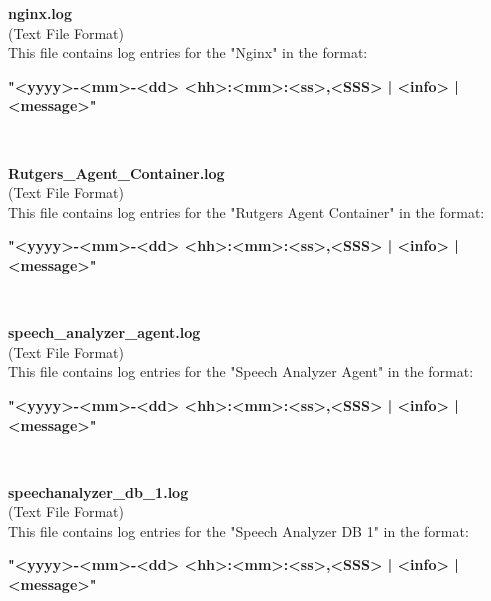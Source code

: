 \begin{description}
\begin{addmargin}[0em]{0em}
    \label{nginx.log}
    \begin{addmargin}[1em]{0em} %
        \textbf{nginx.log}\\
        (Text File Format)\\
        This file contains log entries for the "Nginx" in the format:
        \begin{addmargin}[1em]{0em}
            \textbf{"<yyyy>-<mm>-<dd> <hh>:<mm>:<ss>,<SSS> | <info> | <message>"}
        \end{addmargin}
    \end{addmargin} %
    \textbf{\\}

    \label{Rutgers_Agent_Container.log}
    \begin{addmargin}[1em]{0em} %
        \textbf{Rutgers\_Agent\_Container.log}\\
        (Text File Format)\\
        This file contains log entries for the "Rutgers Agent Container" in the format:
        \begin{addmargin}[1em]{0em}
            \textbf{"<yyyy>-<mm>-<dd> <hh>:<mm>:<ss>,<SSS> | <info> | <message>"}
        \end{addmargin}
    \end{addmargin} %
    \textbf{\\}

    \label{speech_analyzer_agent.log}
    \begin{addmargin}[1em]{0em} %
        \textbf{speech\_analyzer\_agent.log}\\
        (Text File Format)\\
        This file contains log entries for the "Speech Analyzer Agent" in the format:
        \begin{addmargin}[1em]{0em}
            \textbf{"<yyyy>-<mm>-<dd> <hh>:<mm>:<ss>,<SSS> | <info> | <message>"}
        \end{addmargin}
    \end{addmargin} %
    \textbf{\\}

    \label{speechanalyzer_db_1.log}
    \begin{addmargin}[1em]{0em} %
        \textbf{speechanalyzer\_db\_1.log}\\
        (Text File Format)\\
        This file contains log entries for the "Speech Analyzer DB 1" in the format:
        \begin{addmargin}[1em]{0em}
            \textbf{"<yyyy>-<mm>-<dd> <hh>:<mm>:<ss>,<SSS> | <info> | <message>"}
        \end{addmargin}
    \end{addmargin} %
    \textbf{\\}


\end{addmargin}
\end{description}
